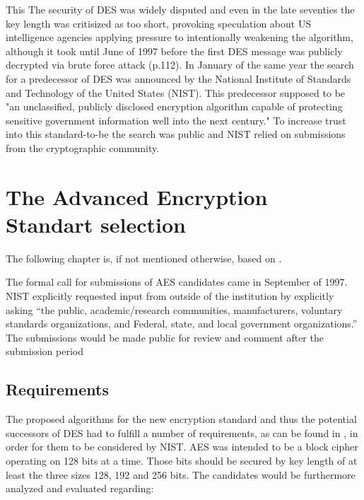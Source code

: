 This
The security of DES was widely disputed and even in the late seventies the key length was critisized as too short, provoking speculation about US intelligence agencies applying pressure to intentionally weakening the algorithm, although it took until June of 1997 before the first DES message was publicly decrypted via brute force attack (p.112). In January of the same year the search for a predecessor of DES was announced by the National Institute of Standards and Technology of the United States (NIST). This predecessor supposed to be "an unclassified, publicly disclosed encryption algorithm capable of protecting sensitive government information well into the next century." To increase trust into this standard-to-be the search was public and NIST relied on submissions from the cryptographic community.


\section{The Advanced Encryption Standart selection}
\label{ch:aes-selection}

The following chapter is, if not mentioned otherwise, based on \cite{nistdevoverview}.

The formal call for submissions of AES candidates came in September of 1997. NIST explicitly requested input from outside of the institution by explicitly asking \enquote{the public, academic/research communities, manufacturers, voluntary standards organizations, and Federal, state, and local government organizations.} The submissions would be made public for review and comment after the submission period

\subsection{Requirements}
\label{ch:requirements}

The proposed algorithms for the new encryption standard and thus the
potential successors of DES had to fulfill a number of requirements, as can be found in \cite{announcementrequest}, in order for them to be considered by NIST. AES was intended to be a block cipher operating on 128 bits at a time. Those bits should be secured by
key length of at least the three sizes 128, 192 and 256 bits.
The candidates would be furthermore analyzed and evaluated regarding:

